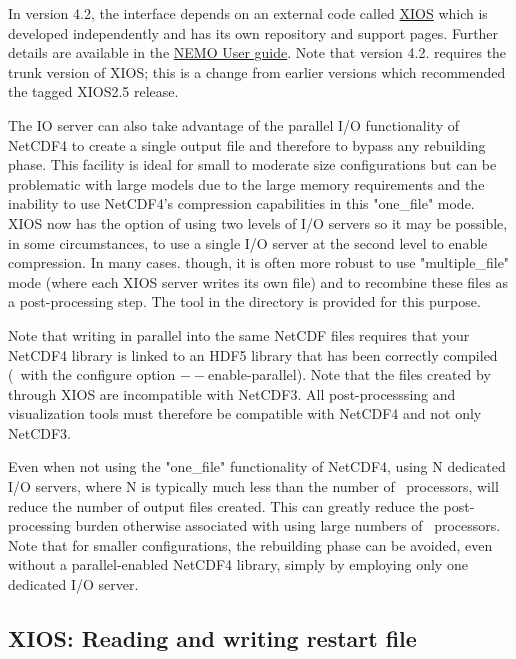 \documentclass[../main/NEMO_manual]{subfiles}
\begin{document}
In version 4.2, the  interface depends on
an external code called \href{https://forge.ipsl.jussieu.fr/ioserver/browser/XIOS/trunk}{XIOS}
which is developed independently and has its own repository and support pages. Further details
are available in the \href{https://sites.nemo-ocean.io/user-guide/}{NEMO User guide}. Note that
version 4.2. requires the trunk version of XIOS; this is a change from earlier versions which
recommended the tagged XIOS2.5 release.

The IO server can also take advantage of the parallel I/O functionality of NetCDF4 to
create a single output file and therefore to bypass any rebuilding phase. This facility is ideal for
small to moderate size configurations but can be problematic with large models due to the large memory
requirements and the inability to use NetCDF4's compression capabilities in this "one\_file" mode.
XIOS now has the option of using two levels of I/O servers so it may be possible, in some circumstances,
to use a single I/O server at the second level to enable compression. In many cases. though, it is
often more robust to use "multiple\_file" mode (where each XIOS server writes its own file) and to
recombine these files as a post-processing step. The  tool in the 
directory is provided for this purpose.

Note that writing in parallel into the same NetCDF files requires that your NetCDF4 library is linked to
an HDF5 library that has been correctly compiled (\ie\ with the configure option $--$enable-parallel).
Note that the files created by  through XIOS are incompatible with NetCDF3.
All post-processsing and visualization tools must therefore be compatible with NetCDF4 and not only NetCDF3.

Even when not using the "one\_file" functionality of NetCDF4, using N dedicated I/O
servers, where N is typically much less than the number of \NEMO\ processors, will reduce
the number of output files created.  This can greatly reduce the post-processing burden
otherwise associated with using large numbers of \NEMO\ processors.  Note that for smaller
configurations, the rebuilding phase can be avoided, even without a parallel-enabled
NetCDF4 library, simply by employing only one dedicated I/O server.

\subsection{XIOS: Reading and writing restart file}
\label{subsec:XIOS_restarts}
\end{document}
